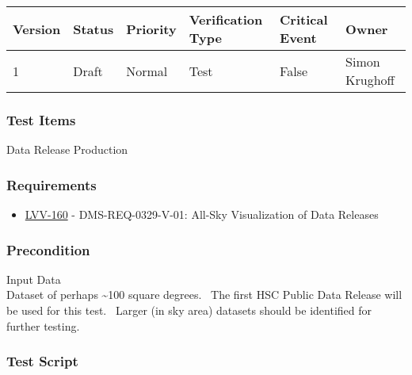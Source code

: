 \begin{longtable}[]{@{}llllll@{}}
\toprule
Version & Status & Priority & Verification Type & Critical Event &
Owner\tabularnewline
\midrule
\endhead
1 & Draft & Normal & Test & False & Simon Krughoff\tabularnewline
\bottomrule
\end{longtable}

\hypertarget{test-items-52}{%
\subsubsection{Test Items}\label{test-items-52}}

Data Release Production

\hypertarget{requirements-53}{%
\subsubsection{Requirements}\label{requirements-53}}

\begin{itemize}
\tightlist
\item
  \href{https://jira.lsstcorp.org/browse/LVV-160}{LVV-160} -
  DMS-REQ-0329-V-01: All-Sky Visualization of Data Releases
\end{itemize}

\hypertarget{precondition-8}{%
\subsubsection{Precondition}\label{precondition-8}}

Input Data\\
Dataset of perhaps \textasciitilde{}100 square degrees. ~The first HSC
Public Data Release will be used for this test. ~Larger (in sky area)
datasets should be identified for further testing.

\hypertarget{test-script-53}{%
\subsubsection{Test Script}\label{test-script-53}}


